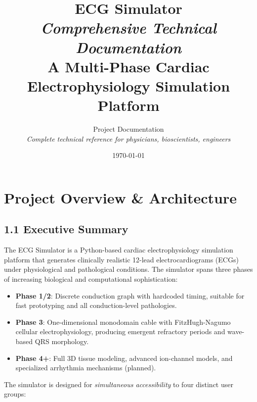 \documentclass[12pt,oneside,a4paper]{book}
\title{%
  \Huge\textbf{ECG Simulator}\\
  \huge\textit{Comprehensive Technical Documentation}\\
  \large{A Multi-Phase Cardiac Electrophysiology Simulation Platform}
}
\author{%
  Project Documentation\\
  \textit{Complete technical reference for physicians, bioscientists, engineers}
}
\date{\today}
\begin{document}
\maketitle

\tableofcontents
\newpage

\listoffigures
\newpage

\listoftables
\newpage


\chapter{Project Overview \& Architecture}

\section{1.1 Executive Summary}

The ECG Simulator is a Python-based cardiac electrophysiology simulation platform that generates clinically realistic 12-lead electrocardiograms (ECGs) under physiological and pathological conditions. The simulator spans three phases of increasing biological and computational sophistication:

\begin{itemize}
  \item \textbf{Phase 1/2}: Discrete conduction graph with hardcoded timing, suitable for fast prototyping and all conduction-level pathologies.
  \item \textbf{Phase 3}: One-dimensional monodomain cable with FitzHugh-Nagumo cellular electrophysiology, producing emergent refractory periods and wave-based QRS morphology.
  \item \textbf{Phase 4+}: Full 3D tissue modeling, advanced ion-channel models, and specialized arrhythmia mechanisms (planned).
\end{itemize}

The simulator is designed for \emph{simultaneous accessibility} to four distinct user groups:
\end{document}
